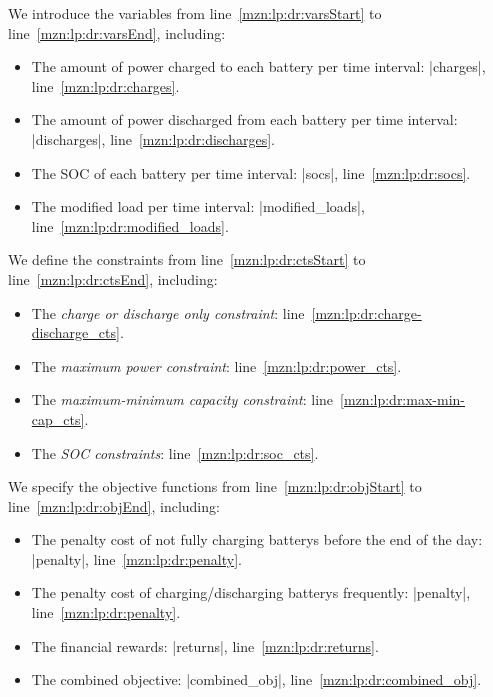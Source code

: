 We introduce the variables from line~\ref{mzn:lp:dr:varsStart} to line~\ref{mzn:lp:dr:varsEnd}, including:
\begin{itemize}
	
	\item The amount of power charged to each battery per time interval: \mzninline|charges|, line~\ref{mzn:lp:dr:charges}.
	
	\item The amount of power discharged from each battery per time interval: \mzninline|discharges|, line~\ref{mzn:lp:dr:discharges}.
	
	\item The \gls{SOC} of each battery per time interval: \mzninline|socs|, line~\ref{mzn:lp:dr:socs}.
	
	\item The modified load per time interval: \mzninline|modified_loads|, line~\ref{mzn:lp:dr:modified_loads}.
\end{itemize}

We define the constraints from line~\ref{mzn:lp:dr:ctsStart} to line~\ref{mzn:lp:dr:ctsEnd}, including:
\begin{itemize}
	\item The \textit{charge or discharge only constraint}: line~\ref{mzn:lp:dr:charge-discharge_cts}.
	
	\item The \textit{maximum power constraint}: line~\ref{mzn:lp:dr:power_cts}.
	
	\item The \textit{maximum-minimum capacity constraint}: line~\ref{mzn:lp:dr:max-min-cap_cts}.
	
	\item The \textit{\gls{SOC} constraints}: line~\ref{mzn:lp:dr:soc_cts}.
	
\end{itemize}

We specify the objective functions from line~\ref{mzn:lp:dr:objStart} to line~\ref{mzn:lp:dr:objEnd}, including:
\begin{itemize}
	
	\item The penalty cost of not fully charging \glspl{battery} before the end of the day: \mzninline|penalty|, line~\ref{mzn:lp:dr:penalty}.
	
	\item The penalty cost of charging/discharging \glspl{battery} frequently: \mzninline|penalty|, line~\ref{mzn:lp:dr:penalty}.
	
	\item The financial rewards: \mzninline|returns|, line~\ref{mzn:lp:dr:returns}.
	
	\item The combined objective: \mzninline|combined_obj|, line~\ref{mzn:lp:dr:combined_obj}.
\end{itemize}


